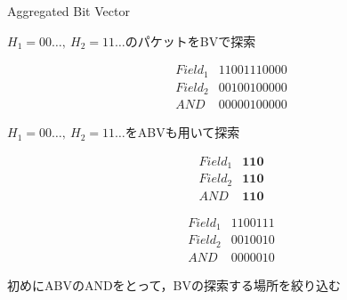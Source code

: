 \documentclass[a4paper,10pt]{jarticle}
\begin{document}
\begin{frame}{Aggregated Bit Vector}

\begin{block}{$H_{1} = 00 \dots, \ H_{2} = 11 \dots$のパケットをBVで探索}

\begin{equation*}
 \begin{array}{ll}
  Field_{1} & 11001110000 \\ 
  Field_{2} & 00100100000 \\ \hline
  AND      & 00000100000 
 \end{array}
\end{equation*}
\end{block}

\begin{block}{$H_{1} = 00 \dots , \ H_{2} = 11 \dots$をABVも用いて探索}
\vspace{-5mm}
\begin{figure}[h]
 \def\@captype{table}
 \begin{minipage}[t]{.45\textwidth}
\begin{equation*}
 \begin{array}{ll}
  Field_{1} & \mathbf{110} \\
  Field_{2} & \mathbf{110} \\ \hline
  AND      &  \mathbf{110}
 \end{array}
\end{equation*}

  \end{minipage}
  \hfill
  \begin{minipage}[t]{.45\textwidth}
\begin{equation*}
 \begin{array}{ll}
  Field_{1} & 1100111 \\
  Field_{2} & 0010010 \\ \hline
  AND      &  0000010
 \end{array}
\end{equation*}

  \end{minipage}
\end{figure}

初めにABVのANDをとって，BVの探索する場所を絞り込む

\end{block}
\end{frame}
\end{document}
